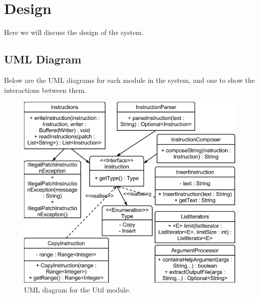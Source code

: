 \section{Design}

Here we will discuss the design of the system.

\subsection{UML Diagram}

Below are the UML diagrams for each module in the system, and one to show the interactions between them.

\begin{figure}[H]
\begin{center}
\includegraphics[width=\textwidth]{design/diffrUML-util.png}
\end{center}
\caption{UML diagram for the Util module.}
\label{fig:utilUML}
\end{figure}

